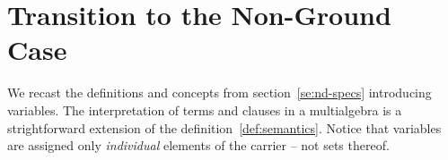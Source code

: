 \section{Transition to the Non-Ground Case}\label{se:ng}
We recast the definitions and concepts from section~\ref{se:nd-specs} introducing
variables. The interpretation of terms and clauses in a multialgebra is a
strightforward extension of the definition~\ref{def:semantics}. Notice that
variables are assigned only {\em individual} elements of the carrier -- not sets
thereof.
%
%
%
